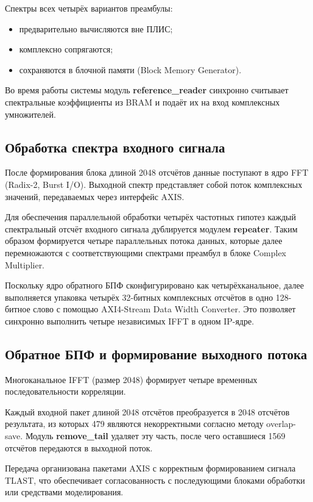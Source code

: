 Спектры всех четырёх вариантов преамбулы:
\begin{itemize}
	\item предварительно вычисляются вне ПЛИС;
	\item комплексно сопрягаются;
	\item сохраняются в блочной памяти (Block Memory Generator).
\end{itemize}

Во время работы системы модуль \textbf{reference\_reader} синхронно считывает спектральные коэффициенты из BRAM и подаёт их на вход комплексных умножителей.

\subsection{Обработка спектра входного сигнала}

После формирования блока длиной 2048 отсчётов данные поступают в ядро FFT (Radix-2, Burst I/O). Выходной спектр представляет собой поток комплексных значений, передаваемых через интерфейс AXIS.

Для обеспечения параллельной обработки четырёх частотных гипотез каждый спектральный отсчёт входного сигнала дублируется модулем \textbf{repeater}. Таким образом формируется четыре параллельных потока данных, которые далее перемножаются с соответствующими спектрами преамбул в блоке Complex Multiplier.

Поскольку ядро обратного БПФ сконфигурировано как четырёхканальное, далее выполняется упаковка четырёх 32-битных комплексных отсчётов в одно 128-битное слово с помощью AXI4-Stream Data Width Converter. Это позволяет синхронно выполнить четыре независимых IFFT в одном IP-ядре.

\subsection{Обратное БПФ и формирование выходного потока}

Многоканальное IFFT (размер 2048) формирует четыре временных последовательности корреляции.  

Каждый входной пакет длиной 2048 отсчётов преобразуется в 2048 отсчётов результата, из которых 479 являются некорректными согласно методу overlap-save. Модуль \textbf{remove\_tail} удаляет эту часть, после чего оставшиеся 1569 отсчётов передаются в выходной поток.

Передача организована пакетами AXIS с корректным формированием сигнала TLAST, что обеспечивает согласованность с последующими блоками обработки или средствами моделирования.

